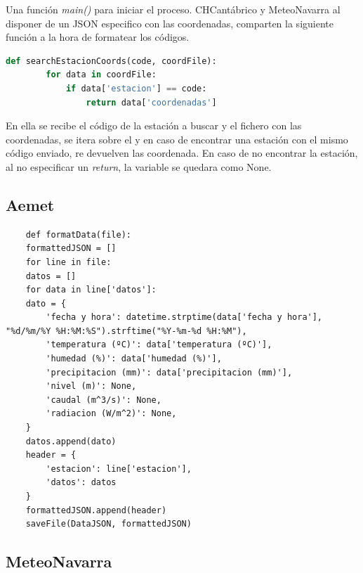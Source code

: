 Una función \textit{main()} para iniciar el proceso.\newline
\newline
CHCantábrico y MeteoNavarra al disponer de un JSON especifico con las coordenadas, comparten la siguiente función a la hora de formatear los códigos.

\begin{lstlisting}[language=Python, caption={Declaración función \textit{searchEstacionCoords()}}]
	def searchEstacionCoords(code, coordFile):
		for data in coordFile:
			if data['estacion'] == code:
				return data['coordenadas']
\end{lstlisting}

En ella se recibe el código de la estación a buscar y el fichero con las coordenadas, se itera sobre el y en caso de encontrar una estación con el mismo código enviado, re devuelven las coordenada. En caso de no encontrar la estación, al no especificar un \textit{return}, la variable se quedara como None.\newline
\newline

\subsection{Aemet}

\begin{lstlisting}
	def formatData(file):
	formattedJSON = []
	for line in file:
	datos = []
	for data in line['datos']:
	dato = {
		'fecha y hora': datetime.strptime(data['fecha y hora'], "%d/%m/%Y %H:%M:%S").strftime("%Y-%m-%d %H:%M"),
		'temperatura (ºC)': data['temperatura (ºC)'],
		'humedad (%)': data['humedad (%)'],
		'precipitacion (mm)': data['precipitacion (mm)'],
		'nivel (m)': None,
		'caudal (m^3/s)': None,
		'radiacion (W/m^2)': None,
	}
	datos.append(dato)
	header = {
		'estacion': line['estacion'],
		'datos': datos
	}
	formattedJSON.append(header)
	saveFile(DataJSON, formattedJSON)
\end{lstlisting}

\subsection{MeteoNavarra}

